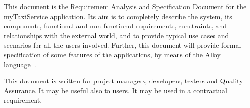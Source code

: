 This document is the  Requirement Analysis and Specification Document for the myTaxiService application.
Its aim is to completely describe the system, its components, functional and non-functional requirements, constraints, and relationships with the external world, and to provide typical use cases and scenarios for all the users involved.
Further, this document will provide formal specification of some features of the applications, by means of the Alloy language~\cite{alloy-site}.

This document is written for project managers, developers, testers and Quality Assurance. It may be useful also to users. It may be used in a contractual requirement.
